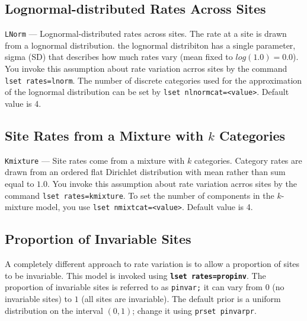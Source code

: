 \documentclass[12pt]{book}
\newcommand{\ttt}[1]{\texttt{#1}}
\newcommand{\tb}[1]{\ttt{\textbf{#1}}}
\begin{document}
\subsection{Lognormal-distributed Rates Across Sites}

\ttt{LNorm} --- Lognormal-distributed rates across sites. The rate at a site is drawn from a
lognormal distribution. the lognormal distribiton has a single parameter, sigma (SD) that describes
how much rates vary (mean fixed to $log(1.0) = 0.0$). You invoke this assumption about rate
variation acrros sites by the command \ttt{lset rates=lnorm}. The number of discrete categories
used for the approximation of the lognormal distribution can be set by \ttt{lset
nlnormcat=<value>}. Default value is 4.

\subsection{Site Rates from a Mixture with $k$ Categories}

\ttt{Kmixture} --- Site rates come from a mixture with $k$ categories. Category rates are drawn
from an ordered flat Dirichlet distribution with mean rather than sum equal to $1.0$. You invoke
this assumption about rate variation acrros sites by the command \ttt{lset rates=kmixture}. To set
the number of components in the $k$-mixture model, you use \ttt{lset nmixtcat=<value>}. Default
value is 4.

\subsection{Proportion of Invariable Sites}

A completely different approach to rate variation is to allow a proportion of sites to be
invariable. This model is invoked using \tb{lset rates=propinv}. The proportion of invariable sites
is referred to as \ttt{pinvar;} it can vary from $0$ (no invariable sites) to $1$ (all sites are
invariable). The default prior is a uniform distribution on the interval $(0,1)$; change it using
\ttt{prset pinvarpr}.
\end{document}
